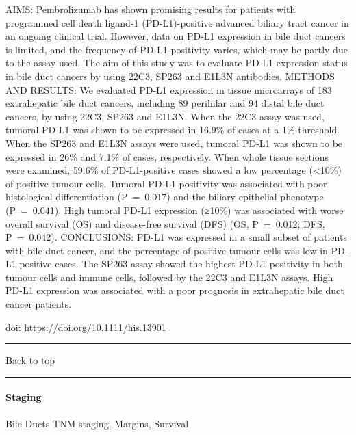 \documentclass[
]{article}
\renewcommand{\linethickness}{0.05em}
\begin{document}
AIMS: Pembrolizumab has shown promising results for patients with
programmed cell death ligand-1 (PD-L1)-positive advanced biliary tract
cancer in an ongoing clinical trial. However, data on PD-L1 expression
in bile duct cancers is limited, and the frequency of PD-L1 positivity
varies, which may be partly due to the assay used. The aim of this study
was to evaluate PD-L1 expression status in bile duct cancers by using
22C3, SP263 and E1L3N antibodies. METHODS AND RESULTS: We evaluated
PD-L1 expression in tissue microarrays of 183 extrahepatic bile duct
cancers, including 89 perihilar and 94 distal bile duct cancers, by
using 22C3, SP263 and E1L3N. When the 22C3 assay was used, tumoral PD-L1
was shown to be expressed in 16.9\% of cases at a 1\% threshold. When
the SP263 and E1L3N assays were used, tumoral PD-L1 was shown to be
expressed in 26\% and 7.1\% of cases, respectively. When whole tissue
sections were examined, 59.6\% of PD-L1-positive cases showed a low
percentage (\textless10\%) of positive tumour cells. Tumoral PD-L1
positivity was associated with poor histological differentiation
(P~=~0.017) and the biliary epithelial phenotype (P~=~0.041). High
tumoral PD-L1 expression (≥10\%) was associated with worse overall
survival (OS) and disease-free survival (DFS) (OS, P~=~0.012; DFS,
P~=~0.042). CONCLUSIONS: PD-L1 was expressed in a small subset of
patients with bile duct cancer, and the percentage of positive tumour
cells was low in PD-L1-positive cases. The SP263 assay showed the
highest PD-L1 positivity in both tumour cells and immune cells, followed
by the 22C3 and E1L3N assays. High PD-L1 expression was associated with
a poor prognosis in extrahepatic bile duct cancer patients.

doi: \url{https://doi.org/10.1111/his.13901}

\begin{center}\rule{0.5\linewidth}{\linethickness}\end{center}

Back to top

\begin{center}\rule{0.5\linewidth}{\linethickness}\end{center}

\pagebreak

\hypertarget{staging}{%
\paragraph{Staging}\label{staging}}

Bile Ducts TNM staging, Margins, Survival
\end{document}
